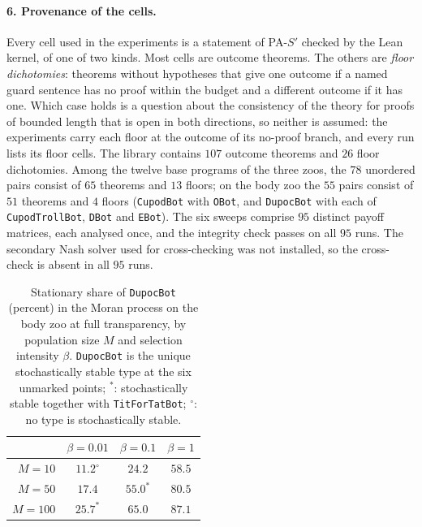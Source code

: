 \paragraph{6. Provenance of the cells.}
Every cell used in the experiments is a statement of PA-$S'$ checked by the Lean kernel, of one of two kinds. Most cells are outcome theorems. The others are \emph{floor dichotomies}: theorems without hypotheses that give one outcome if a named guard sentence has no proof within the budget and a different outcome if it has one. Which case holds is a question about the consistency of the theory for proofs of bounded length that is open in both directions, so neither is assumed: the experiments carry each floor at the outcome of its no-proof branch, and every run lists its floor cells.
The library contains $107$ outcome theorems and $26$ floor dichotomies. Among the twelve base programs of the three zoos, the $78$ unordered pairs consist of $65$ theorems and $13$ floors; on the body zoo the $55$ pairs consist of $51$ theorems and $4$ floors (\texttt{CupodBot} with \texttt{OBot}, and \texttt{DupocBot} with each of \texttt{CupodTrollBot}, \texttt{DBot} and \texttt{EBot}).
The six sweeps comprise $95$ distinct payoff matrices, each analysed once, and the integrity check passes on all $95$ runs. The secondary Nash solver used for cross-checking was not installed, so the cross-check is absent in all $95$ runs.
%
\begin{table}[t]
\centering
\begin{tabular}{rccc}
\toprule
 & $\beta=0.01$ & $\beta=0.1$ & $\beta=1$ \\
\midrule
$M=10$  & $11.2^{\circ}$ & $24.2$ & $58.5$ \\
$M=50$  & $17.4$ & $55.0^{\ast}$ & $80.5$ \\
$M=100$ & $25.7^{\ast}$ & $65.0$ & $\mathbf{87.1}$ \\
\bottomrule
\end{tabular}
\caption{Stationary share of \texttt{DupocBot} (percent) in the Moran process on the body zoo at full transparency, by population size $M$ and selection intensity $\beta$. \texttt{DupocBot} is the unique stochastically stable type at the six unmarked points; ${}^{\ast}$: stochastically stable together with \texttt{TitForTatBot}; ${}^{\circ}$: no type is stochastically stable.}
\label{tab:sprime-moran-body}
\end{table}

